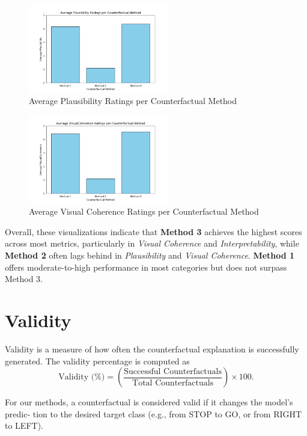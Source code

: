 \begin{figure}[htbp]
    \centering
    \includegraphics[width=0.55\textwidth]{img/results/Plausibility_ratings.png}
    \caption{Average Plausibility Ratings per Counterfactual Method}
    \label{fig:plausibilityBar}
\end{figure}

\begin{figure}[htbp]
    \centering
    \includegraphics[width=0.55\textwidth]{img/results/VisualCoherence_ratings.png}
    \caption{Average Visual Coherence Ratings per Counterfactual Method}
    \label{fig:visualCoherenceBar}
\end{figure}

Overall, these visualizations indicate that \textbf{Method 3} achieves the highest scores across most metrics, particularly in 
\textit{Visual Coherence} and \textit{Interpretability}, while \textbf{Method 2} often lags behind in \textit{Plausibility} and 
\textit{Visual Coherence}. \textbf{Method 1} offers moderate-to-high performance in most categories but does not surpass Method 3.

\section{Validity}
\label{sec:validity}
Validity is a measure of how often the counterfactual explanation is successfully generated. 
The validity percentage is computed as
\[
\text{Validity (\%)} = \left( \frac{\text{Successful Counterfactuals}}{\text{Total Counterfactuals}} \right) \times 100.
\]

For our methods, a counterfactual is considered valid if it changes the model’s predic-
tion to the desired target class (e.g., from STOP to GO, or from RIGHT to LEFT). 

